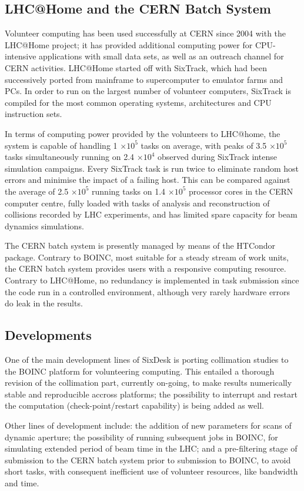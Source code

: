 \documentclass[a4paper,
              ]{jacow}
\begin{document}
\subsection{LHC@Home and the CERN Batch System}
Volunteer computing has been used successfully at
CERN since 2004 with the LHC@Home project; it has
provided additional computing power for CPU-intensive
applications with small data sets, as well as an outreach
channel for CERN activities. LHC@Home started off with
SixTrack, which had been successively
ported from mainframe to supercomputer to emulator
farms and PCs. In order to run on the largest number of
volunteer computers, SixTrack is compiled for the most common
operating systems, architectures and CPU instruction sets.

In terms of computing power provided by the volunteers
to LHC@home, the system is capable of handling 1 $\times 10^5$ tasks on average, with peaks of 3.5 $\times 10^5$
tasks simultaneously running on 2.4 $\times 10^4$ observed
during SixTrack intense simulation campaigns. Every
SixTrack task is run twice to eliminate random host errors
and minimise the impact of a failing host. This can be
compared against the average of 2.5 $\times 10^5$
running tasks on 1.4 $\times 10^5$ processor cores in the
CERN computer centre,
fully loaded with tasks of analysis and reconstruction
of collisions recorded by LHC experiments, and
has limited spare capacity for beam dynamics simulations.

The CERN batch system is presently managed by means of the
HTCondor~\cite{HTCondor} package. Contrary to BOINC, most
suitable for a steady stream of work units, the CERN batch
system provides users with a responsive computing
resource. Contrary to LHC@Home, no redundancy is implemented in task submission since the code run in a controlled environment, although very rarely hardware errors do leak in the results.

\subsection{Developments}
One of the main development lines of SixDesk is porting
collimation studies to the BOINC platform for volunteering
computing. This entailed a thorough revision of the collimation
part, currently on-going, to make results numerically stable
and reproducible accross platforms; the possibility to interrupt
and restart the computation (check-point/restart capability)
is being added as well.

Other lines of development include: the addition of new
parameters for scans of dynamic aperture; the possibility
of running subsequent jobs in BOINC, for simulating extended
period of beam time in the LHC; and a pre-filtering
stage of submission to the CERN batch system prior to submission
to BOINC, to avoid short tasks, with consequent inefficient use
of volunteer resources, like bandwidth and time.
\end{document}
